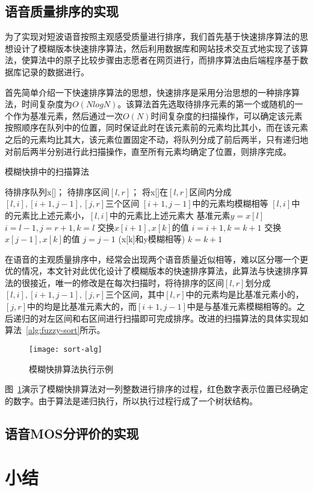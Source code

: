 \subsection{语音质量排序的实现}
为了实现对短波语音按照主观感受质量进行排序，我们首先基于快速排序算法的思想设计了模糊版本快速排序算法，然后利用数据库和网站技术交互式地实现了该算法，使算法中的原子比较步骤由志愿者在网页进行，而排序算法由后端程序基于数据库记录的数据进行。

首先简单介绍一下快速排序算法的思想，快速排序是采用分治思想的一种排序算法，时间复杂度为$O(NlogN)$。该算法首先选取待排序元素的第一个或随机的一个作为基准元素，然后通过一次$O(N)$时间复杂度的扫描操作，可以确定该元素按照顺序在队列中的位置，同时保证此时在该元素前的元素均比其小，而在该元素之后的元素均比其大，该元素位置固定不动，将队列分成了前后两半，只有递归地对前后两半分别进行此扫描操作，直至所有元素均确定了位置，则排序完成。

\begin{algorithm}
    \caption{模糊快排中的扫描算法}
    \label{alg:fuzzy-sort}
\begin{algorithmic}[1]
\INPUT
    \Statex 待排序队列x[]；
    \Statex 待排序区间$[l, r]$；
\OUTPUT
    \Statex 将x[]在$[l, r]$区间内分成$[l, i], [i+1,  j-1], [j, r]$三个区间
    \Statex $[i+1,  j-1]$中的元素均模糊相等
    \Statex $[l, i]$中的元素比上述元素小，$[l, i]$中的元素比上述元素大
\State 基准元素$y = x[l]$
\State $i=l-1, j=r+1, k=l$
        \State 交换$x[i+1], x[k]$的值
        \State $i = i + 1, k = k + 1$
        \State 交换$x[j-1], x[k]$的值
        \State $j=j-1$
    \Else
        \State (x[k]和y模糊相等) $k=k+1$ 
    \EndIf
\EndWhile
\end{algorithmic}
\end{algorithm}

在语音的主观质量排序中，经常会出现两个语音质量近似相等，难以区分哪一个更优的情况，本文针对此优化设计了模糊版本的快速排序算法，此算法与快速排序算法的很接近，唯一的修改是在每次扫描时，将待排序的区间$[l, r]$划分成$[l, i], [i+1,  j-1], [j, r]$三个区间，其中$[l, r]$中的元素均是比基准元素小的，$[j, r]$中的均是比基准元素大的，而$[i+1,  j-1]$中是与基准元素模糊相等的。之后递归的对左区间和右区间进行扫描即可完成排序。改进的扫描算法的具体实现如算法~\ref{alg:fuzzy-sort}所示。

\begin{figure}
\centering
\texttt{[image: sort-alg]}
\caption{模糊快排算法执行示例\label{fig:fuzzy-sort}}
\end{figure}

图~\ref{fig:fuzzy-sort}演示了模糊快排算法对一列整数进行排序的过程，红色数字表示位置已经确定的数字。由于算法是递归执行，所以执行过程行成了一个树状结构。

\subsection{语音MOS分评价的实现}

\section{小结}


